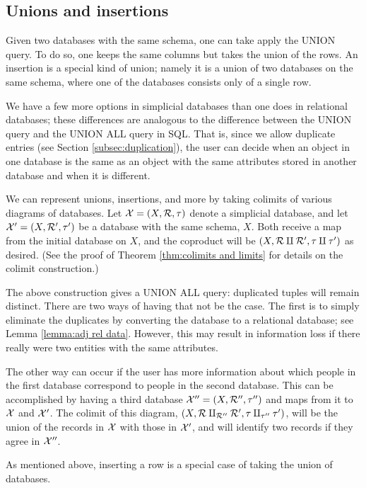 \documentclass{amsart}
\begin{document}
\subsection{Unions and insertions}

Given two databases with the same schema, one can take apply the UNION query.  To do so, one keeps the same columns but takes the union of the rows.  An insertion is a special kind of union; namely it is a union of two databases on the same schema, where one of the databases consists only of a single row.

We have a few more options in simplicial databases than one does in relational databases; these differences are analogous to the difference between the UNION query and the UNION ALL query in SQL.  That is, since we allow duplicate entries (see Section \ref{subsec:duplication}), the user can decide when an object in one database is the same as an object with the same attributes stored in another database and when it is different.  

We can represent unions, insertions, and more by taking colimits of various diagrams of databases.  Let $\mathcal{X}=(X,\mathcal{R},\tau)$ denote a simplicial database, and let $\mathcal{X}'=(X,\mathcal{R}',\tau')$ be a database with the same schema, $X$.  Both receive a map from the initial database on $X$, and the coproduct will be $(X,\mathcal{R}\amalg\mathcal{R}',\tau\amalg\tau')$ as desired.  (See the proof of Theorem \ref{thm:colimits and limits} for details on the colimit construction.)

The above construction gives a UNION ALL query: duplicated tuples will remain distinct.  There are two ways of having that not be the case.  The first is to simply eliminate the duplicates by converting the database to a relational database; see Lemma \ref{lemma:adj rel data}.  However, this may result in information loss if there really were two entities with the same attributes.

The other way can occur if the user has more information about which people in the first database correspond to people in the second database.  This can be accomplished by having a third database $\mathcal{X}''=(X,\mathcal{R}'',\tau'')$ and maps from it to $\mathcal{X}$ and $\mathcal{X}'$.  The colimit of this diagram, $(X,\mathcal{R}\amalg_{\mathcal{R}''}\mathcal{R}',\tau\amalg_{\tau''}\tau')$, will be the union of the records in $\mathcal{X}$ with those in $\mathcal{X}'$, and will identify two records if they agree in $\mathcal{X}''$.

As mentioned above, inserting a row is a special case of taking the union of databases.
\end{document}

